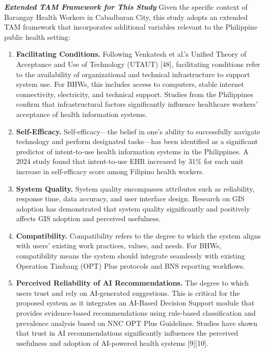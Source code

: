 \documentclass[12pt, a4paper]{report}
\begin{document}
\noindent \textbf{\textit{Extended TAM Framework for This Study}}
Given the specific context of Barangay Health Workers in Cabadbaran City, this study adopts an extended TAM framework that incorporates additional variables relevant to the Philippine public health setting:

\begin{enumerate}
    \item \textbf{Facilitating Conditions.} Following Venkatesh et al.'s Unified Theory of Acceptance and Use of Technology (UTAUT) [48], facilitating conditions refer to the availability of organizational and technical infrastructure to support system use. For BHWs, this includes access to computers, stable internet connectivity, electricity, and technical support. Studies from the Philippines confirm that infrastructural factors significantly influence healthcare workers' acceptance of health information systems.
    \item \textbf{Self-Efficacy.} Self-efficacy---the belief in one's ability to successfully navigate technology and perform designated tasks---has been identified as a significant predictor of intent-to-use health information systems in the Philippines. A 2024 study found that intent-to-use EHR increased by 31\% for each unit increase in self-efficacy score among Filipino health workers.
    \item \textbf{System Quality.} System quality encompasses attributes such as reliability, response time, data accuracy, and user interface design. Research on GIS adoption has demonstrated that system quality significantly and positively affects GIS adoption and perceived usefulness.
    \item \textbf{Compatibility.} Compatibility refers to the degree to which the system aligns with users' existing work practices, values, and needs. For BHWs, compatibility means the system should integrate seamlessly with existing Operation Timbang (OPT) Plus protocols and BNS reporting workflows.
    \item \textbf{Perceived Reliability of AI Recommendations.} The degree to which users trust and rely on AI-generated suggestions. This is critical for the proposed system as it integrates an AI-Based Decision Support module that provides evidence-based recommendations using rule-based classification and prevalence analysis based on NNC OPT Plus Guidelines. Studies have shown that trust in AI recommendations significantly influences the perceived usefulness and adoption of AI-powered health systems [9][10].
\end{enumerate}
\end{document}
